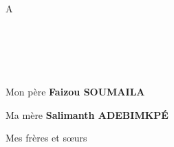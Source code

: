 \dedicace

\paragraph{}
	\begin{center}
		A    
	\end{center}
	\subparagraph*{\\ \\ \\}
	\begin{center}
    Mon père  \textbf{Faizou SOUMAILA}  
	\end{center}
	\begin{center}
    Ma mère  \textbf{Salimanth ADEBIMKPÉ}  
	\end{center}
	\begin{center}
      Mes frères et sœurs 
	\end{center}

 